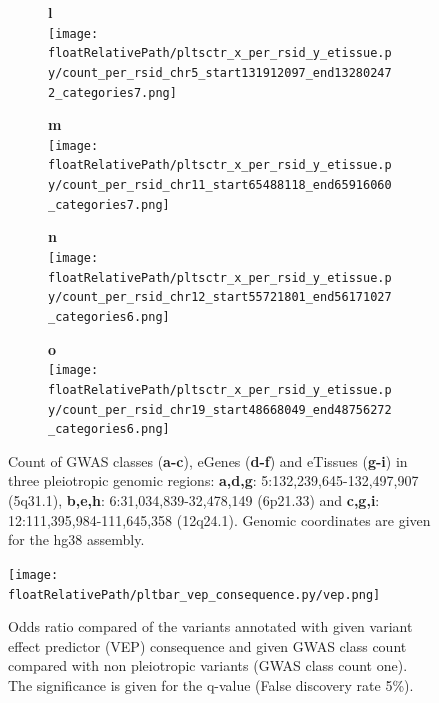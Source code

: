 \begin{figure}[!tbp]
\begin{subfigure}[]{.24\textwidth}
\textbf{l}
\\
\texttt{[image: \\floatRelativePath/pltsctr\_x\_per\_rsid\_y\_etissue.py/count\_per\_rsid\_chr5\_start131912097\_end132802472\_categories7.png]}
\end{subfigure}
%
\begin{subfigure}[]{.24\textwidth}
\textbf{m}
\\
\texttt{[image: \\floatRelativePath/pltsctr\_x\_per\_rsid\_y\_etissue.py/count\_per\_rsid\_chr11\_start65488118\_end65916060\_categories7.png]}
\end{subfigure}
%
\begin{subfigure}[]{.24\textwidth}
\textbf{n}
\\
\texttt{[image: \\floatRelativePath/pltsctr\_x\_per\_rsid\_y\_etissue.py/count\_per\_rsid\_chr12\_start55721801\_end56171027\_categories6.png]}
\end{subfigure}
%
\begin{subfigure}[]{.24\textwidth}
\textbf{o}
\\
\texttt{[image: \\floatRelativePath/pltsctr\_x\_per\_rsid\_y\_etissue.py/count\_per\_rsid\_chr19\_start48668049\_end48756272\_categories6.png]}
\end{subfigure}

\caption{Count of GWAS classes (\textbf{a-c}), eGenes (\textbf{d-f}) and eTissues (\textbf{g-i}) in three pleiotropic genomic regions: \textbf{a,d,g}: 5:132,239,645-132,497,907 (5q31.1), \textbf{b,e,h}: 6:31,034,839-32,478,149 (6p21.33) and \textbf{c,g,i}: 12:111,395,984-111,645,358 (12q24.1). Genomic coordinates are given for the hg38 assembly.}
\label{fig:region_gwas_egenes_tissues}
%
\end{figure}
%
%
\begin{figure}[!tbp]
\centering
%
\texttt{[image: \\floatRelativePath/pltbar\_vep\_consequence.py/vep.png]}
%
\caption{Odds ratio compared of the variants annotated with given variant effect
predictor (VEP) consequence and given GWAS class count compared with non
pleiotropic variants (GWAS class count one). The significance is given for the
q-value (False discovery rate 5\%).}
\label{fig:vep_consequence}
%
\end{figure}
